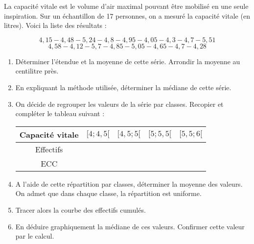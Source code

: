 
La capacité vitale est le volume d'air maximal pouvant être mobilisé en une seule inspiration. Sur un échantillon de 17 personnes, on a mesuré la capacité vitale (en litres). Voici la liste des résultats :

$$4,15 - 4,48 - 5,24 - 4,8 - 4,95 - 4,05 - 4,3 - 4,7 - 5,51$$
$$ 4,58 - 4,12 - 5,7 - 4,85 - 5,05 - 4,65 - 4,7 - 4,28$$

\begin{enumerate}
\item Déterminer l'étendue et la moyenne de cette série. Arrondir la moyenne au centilitre près.
\item  En expliquant la méthode utilisée, déterminer la médiane de cette série.
\item  On décide de regrouper les valeurs de la série par classes. Recopier et compléter le tableau suivant :

\begin{tabular}{|c|c|c|c|c|}
\hline 
Capacité vitale   & $[4 ; 4,5[$ & $[4,5 ; 5[$ & $[5 ; 5,5[$ & $[5,5 ; 6[$ \\ 
\hline 
Effectifs &  &  &  &  \\ 
\hline 
ECC &  &  &  &  \\ 
\hline 
\end{tabular} 

\item  A l'aide de cette répartition par classes, déterminer la moyenne des valeurs.
On admet que dans chaque classe, la répartition est uniforme.
\item  Tracer alors la courbe des effectifs cumulés.
\item En déduire graphiquement la médiane de ces valeurs. Confirmer cette valeur par le calcul.
\end{enumerate}